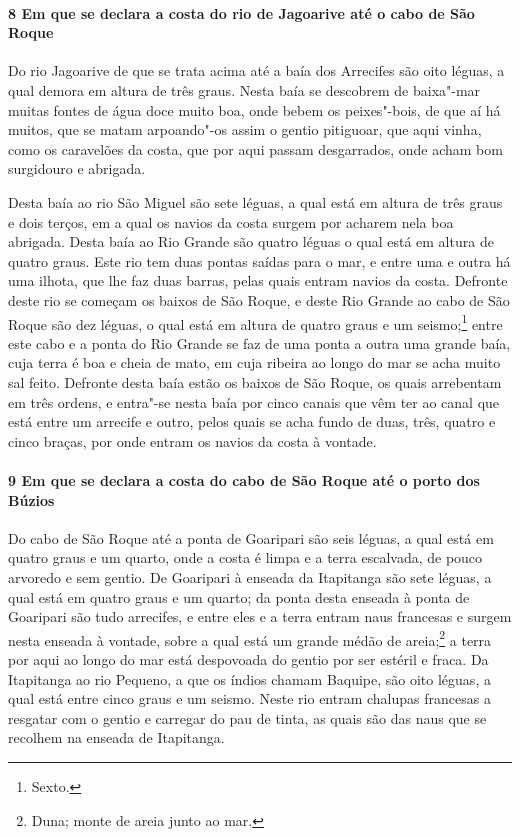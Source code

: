 \paragraph{8 Em que se declara a costa do rio de Jagoarive até o cabo de São Roque}

Do rio Jagoarive de que se trata acima até a baía dos Arrecifes são oito léguas, a qual
demora em altura de três graus. Nesta baía se descobrem de baixa"-mar muitas fontes de água
doce muito boa, onde bebem os peixes"-bois, de que aí há muitos, que se matam arpoando"-os
assim o gentio pitiguoar, que aqui vinha, como os caravelões da costa, que por aqui passam
desgarrados, onde acham bom surgidouro e abrigada.

Desta baía ao rio São Miguel são sete léguas, a qual está em altura de três graus e dois
terços, em a qual os navios da costa surgem por acharem nela boa abrigada. Desta baía ao
Rio Grande são quatro léguas o qual está em altura de quatro graus. Este rio tem duas
pontas saídas para o mar, e entre uma e outra há uma ilhota, que lhe faz duas barras,
pelas quais entram navios da costa. Defronte deste rio se começam os baixos de São Roque,
e deste Rio Grande ao cabo de São Roque são dez léguas, o qual está em altura de quatro
graus e um seismo;\footnote{ Sexto.} entre este cabo e a ponta do Rio Grande se faz de uma
ponta a outra uma grande baía, cuja terra é boa e cheia de mato, em cuja ribeira ao longo
do mar se acha muito sal feito. Defronte desta baía estão os baixos de São Roque, os quais
arrebentam em três ordens, e entra"-se nesta baía por cinco canais que vêm ter ao canal que
está entre um arrecife e outro, pelos quais se acha fundo de duas, três, quatro e cinco
braças, por onde entram os navios da costa à vontade.

\paragraph{9 Em que se declara a costa do cabo de São Roque até o porto dos Búzios}

Do cabo de São Roque até a ponta de Goaripari são seis léguas, a qual está em quatro graus
e um quarto, onde a costa é limpa e a terra escalvada, de pouco arvoredo e sem gentio. De
Goaripari à enseada da Itapitanga são sete léguas, a qual está em quatro graus e um
quarto; da ponta desta enseada à ponta de Goaripari são tudo arrecifes, e entre eles e a
terra entram naus francesas e surgem nesta enseada à vontade, sobre a qual está um grande
médão de areia;\footnote{ Duna; monte de areia junto ao mar.} a terra por aqui ao longo do mar
está despovoada do gentio por ser estéril e fraca. Da Itapitanga ao rio Pequeno, a que os
índios chamam Baquipe, são oito léguas, a qual está entre cinco graus e um seismo. Neste
rio entram chalupas francesas a resgatar com o gentio e carregar do pau de tinta, as quais
são das naus que se recolhem na enseada de Itapitanga.

